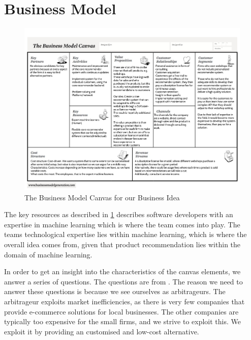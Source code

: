 \section{Business Model}
\begin{figure}
	\centering
	\includegraphics[width = 1.5\textwidth, angle=90]{figures/business-model-canvas}
	\caption{The Business Model Canvas for our Business Idea}
	\label{fig:BusinessModelCanvas}
\end{figure}

The key resources as described in \cref{fig:BusinessModelCanvas} describes software developers with an expertise in machine learning which is where the team comes into play.
The teams technological expertise lies within machine learning, which is where the overall idea comes from, given that product recommendation lies within the domain of machine learning.

In order to get an insight into the characteristics of the canvas elements, we answer a series of questions. 
The questions are from \citet[pg. 40-55]{book:jrose}.
The reason we need to answer these questions is because we see ourselves as arbitrageurs.
The arbitrageur exploits market inefficiencies, as there is very few companies that provide e-commerce solutions for local businesses. 
The other companies are typically too expensive for the small firms, and we strive to exploit this.
We exploit it by providing an customised and low-cost alternative.


